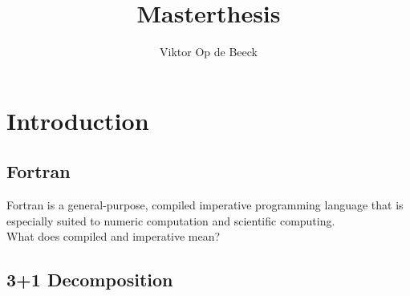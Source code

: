 \documentclass[a4paper]{article}
\title{Masterthesis}
\author{Viktor Op de Beeck}
\begin{document}
\maketitle

\section{Introduction}
\subsection{Fortran}
Fortran is a general-purpose, compiled imperative programming language that is especially suited to numeric computation and scientific computing.
\\
What does compiled and imperative mean?
\subsection{3+1 Decomposition}
\end{document}

